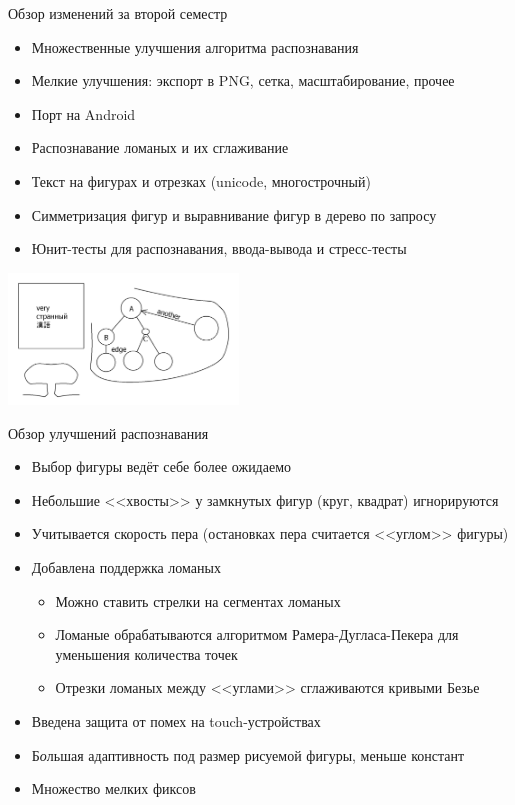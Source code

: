 \documentclass[utf8,xcolor=table]{beamer}
\begin{document}
\begin{frame}[t]{Обзор изменений за второй семестр}
  \begin{itemize}
  \item Множественные улучшения алгоритма распознавания
  \item Мелкие улучшения: экспорт в PNG, сетка, масштабирование, прочее
  \item Порт на Android
  \item Распознавание ломаных и их сглаживание
  \item Текст на фигурах и отрезках (unicode, многострочный)
  \item Симметризация фигур и выравнивание фигур в дерево по запросу
  \item Юнит-тесты для распознавания, ввода-вывода и стресс-тесты
  \end{itemize}
  \begin{center}
    \includegraphics[height=3.5cm]{demo}
  \end{center}
\end{frame}

\begin{frame}[t]{Обзор улучшений распознавания}
  \begin{itemize}
  \item Выбор фигуры ведёт себе более ожидаемо
  \item Небольшие <<хвосты>> у замкнутых фигур (круг, квадрат) игнорируются
  \item Учитывается скорость пера (остановках пера считается <<углом>> фигуры)
  \item Добавлена поддержка ломаных
    \begin{itemize}
      \item Можно ставить стрелки на сегментах ломаных
      \item Ломаные обрабатываются алгоритмом Рамера-Дугласа-Пекера для уменьшения количества точек
      \item Отрезки ломаных между <<углами>> сглаживаются кривыми Безье
    \end{itemize}
  \item Введена защита от помех на touch-устройствах
  \item Б\textit{о}льшая адаптивность под размер рисуемой фигуры, меньше констант
  \item Множество мелких фиксов
  \end{itemize}
\end{frame}
\end{document}
